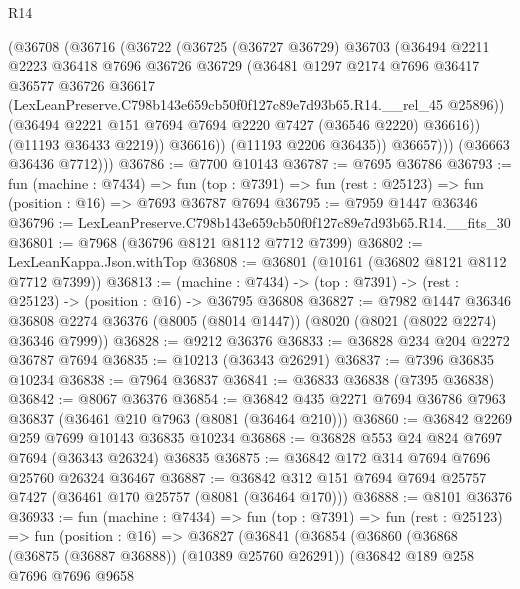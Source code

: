 \begin{lexlean}{R14}
\begin{coremodule}
              (@36708
                (@36716
                  (@36722
                    (@36725
                      (@36727 @36729)
                      @36703
                      (@36494
                        @2211
                        @2223
                        @36418
                        @7696
                        @36726
                        @36729
                        (@36481
                          @1297
                          @2174
                          @7696
                          @36417
                          @36577
                          @36726
                          @36617
                          (LexLeanPreserve.C798b143e659cb50f0f127c89e7d93b65.R14.__rel_45 @25896))
                        (@36494 @2221 @151 @7694 @7694 @2220 @7427 (@36546 @2220) @36616))
                      (@11193 @36433 @2219))
                    @36616))
                (@11193 @2206 @36435))
              @36657)))
        (@36663 @36436 @7712)))
@36786 := @7700 @10143
@36787 := @7695 @36786
@36793 := fun (machine : @7434) =>
  fun (top : @7391) => fun (rest : @25123) => fun (position : @16) => @7693 @36787 @7694
@36795 := @7959 @1447 @36346
@36796 := LexLeanPreserve.C798b143e659cb50f0f127c89e7d93b65.R14.__fits_30
@36801 := @7968 (@36796 @8121 @8112 @7712 @7399)
@36802 := LexLeanKappa.Json.withTop
@36808 := @36801 (@10161 (@36802 @8121 @8112 @7712 @7399))
@36813 := (machine : @7434) -> (top : @7391) -> (rest : @25123) -> (position : @16) -> @36795 @36808
@36827 := @7982
    @1447
    @36346
    @36808
    @2274
    @36376
    (@8005 (@8014 @1447))
    (@8020 (@8021 (@8022 @2274) @36346 @7999))
@36828 := @9212 @36376
@36833 := @36828 @234 @204 @2272 @36787 @7694
@36835 := @10213 (@36343 @26291)
@36837 := @7396 @36835 @10234
@36838 := @7964 @36837
@36841 := @36833 @36838 (@7395 @36838)
@36842 := @8067 @36376
@36854 := @36842 @435 @2271 @7694 @36786 @7963 @36837 (@36461 @210 @7963 (@8081 (@36464 @210)))
@36860 := @36842 @2269 @259 @7699 @10143 @36835 @10234
@36868 := @36828 @553 @24 @824 @7697 @7694 (@36343 @26324) @36835
@36875 := @36842 @172 @314 @7694 @7696 @25760 @26324 @36467
@36887 := @36842 @312 @151 @7694 @7694 @25757 @7427 (@36461 @170 @25757 (@8081 (@36464 @170)))
@36888 := @8101 @36376
@36933 := fun (machine : @7434) =>
  fun (top : @7391) =>
  fun (rest : @25123) =>
  fun (position : @16) =>
  @36827
    (@36841
      (@36854
        (@36860
          (@36868 (@36875 (@36887 @36888)) (@10389 @25760 @26291))
          (@36842
            @189
            @258
            @7696
            @7696
            @9658

\end{coremodule}
\end{lexlean}
